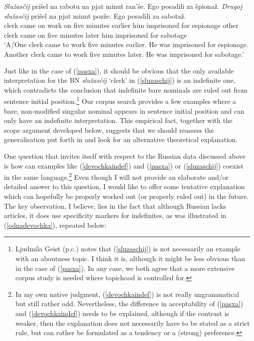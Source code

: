 \documentclass[output=paper,colorlinks,citecolor=brown]{langscibook}
\begin{document}
\ea \label{sluzaschij} \gll 
\textit{Slu\v{z}as\v{c}ij} pri\v{s}el na rabotu na pjat minut ran'\v{s}e. Ego posadili za \v{s}piona\v{z}. \textit{Drugoj} \textit{slu\v{z}as\v{c}ij} pri\v{s}el na pjat minut poz\v{z}e. Ego posadili za sabota\v{z}.\\
clerk came on work on five minutes earlier him imprisoned for espionage other clerk came on five minutes later him imprisoned for sabotage \\
\glt `A/One clerk came to work five minutes earlier. He was imprisoned for espionage. Another clerk came to work five minutes later. He was imprisoned for sabotage.'
\z

\noindent Just like in the case of (\ref{pasxa}), it should be obvious that the only available interpretation for the BN \textit{slu\v{z}as\v{c}ij} `clerk' in (\ref{sluzaschij}) is an indefinite one, which contradicts the conclusion that indefinite bare nominals are ruled out from sentence initial position.\footnote{Ljudmila Geist (p.c.) notes that (\ref{sluzaschij}) is not necessarily an example with an aboutness topic. I think it is, although it might be less obvious than in the case of (\ref{pasxa}). In any case, we both agree that a more extensive corpus study is needed where topichood is controlled for.} Our corpus search provides a few examples where a bare, non-modified singular nominal appears in sentence initial position and can only have an indefinite interpretation. This empirical fact, together with the scope argument developed below, suggests that we should reassess the generalisation put forth in \citet{geist10} and look for an alternative theoretical explanation.

One question that invites itself with respect to the Russian data discussed above is how can examples like (\ref{devochkaindef}) and (\ref{pasxa}) or (\ref{sluzaschij}) coexist in the same language.\footnote{In my own native judgment, (\ref{devochkaindef}) is not really ungrammatical but still rather odd. Nevertheless, the difference in acceptability of (\ref{pasxa}) and (\ref{devochkaindef}) needs to be explained, although if the contrast is weaker, then the explanation does not necessarily have to be stated as a strict rule, but can rather be formulated as a tendency or a (strong) preference.} Even though I will not provide an elaborate and/or detailed answer to this question, I would like to offer some tentative explanation which can hopefully be properly worked out (or properly ruled out) in the future. The key observation, I believe, lies in the fact that although Russian lacks articles, it does use specificity markers for indefinites, as was illustrated in (\ref{odnadevochka}), repeated below: 
\end{document}
